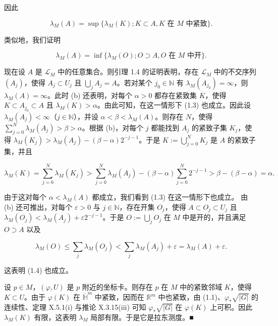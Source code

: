 \begin{proposition}
\begin{items}
因此

\begin{equation}
\lambda_M(A) = \sup\{ \lambda_M(K) ; K \subset A, K \text{ 在 } M \text{ 中紧致} \} .\tag{1.3}
\end{equation}

类似地，我们证明

\begin{equation}
\lambda_M(A) = \inf\{ \lambda_M(O) ; O \supset A, O \text{ 在 } M \text{ 中开} \} .\tag{1.4}
\end{equation}
\item

现在设 $ A $ 是 $ \mathcal{L}_M $ 中的任意集合。则引理 1.4 的证明表明，存在 $ \mathcal{L}_M $ 中的不交序列 $ (A_j) $，使得 $ A_j \subset U_j $ 且 $ \bigcup_j A_j = A $。若对某个 $ j_0 \in \mathbb{N} $ 有 $ \lambda_M(A_{j_0}) = \infty $，则 $ \lambda_M(A) = \infty $。此时 (b) 还表明，对每个 $ \alpha > 0 $ 都存在紧致集 $ K $，使得 $ K \subset A_{j_0} \subset A $ 且 $ \lambda_M(K) > \alpha $。由此可知，在这一情形下 (1.3) 也成立。因此设 $ \lambda_M(A_j) < \infty $（$ j \in \mathbb{N} $），并设 $ \alpha < \beta < \lambda_M(A) $。则存在 $ N $，使得 $ \sum_{j=0}^{N} \lambda_M(A_j) > \beta > \alpha $。根据 (b)，对每个 $ j $ 都能找到 $ A_j $ 的紧致子集 $ K_j $，使得 $ \lambda_M(K_j) > \lambda_M(A_j) - (\beta - \alpha)2^{-j-1} $。于是 $ K := \bigcup_{j=0}^{N} K_j $ 是 $ A $ 的紧致子集，并且

\[
\lambda_M(K) = \sum_{j=0}^{N} \lambda_M(K_j) > \sum_{j=0}^{N} \lambda_M(A_j) - (\beta - \alpha)\sum_{j=0}^{N} 2^{-j-1} > \beta - (\beta - \alpha) = \alpha .
\]

由于这对每个 $ \alpha < \lambda_M(A) $ 都成立，我们看到 (1.3) 在这一情形下也成立。
由 (b) 还可推出，对每个 $ \varepsilon > 0 $ 与 $ j \in \mathbb{N} $，存在开集 $ O_j $，使得 $ A \subset O_j \subset U_j $ 且 $ \lambda_M(O_j) < \lambda_M(A_j) + \varepsilon 2^{-j-1} $。于是 $ O := \bigcup_j O_j $ 在 $ M $ 中是开的，并且满足 $ O \supset A $ 以及

\[
\lambda_M(O) \le \sum_j \lambda_M(O_j) < \sum_j \lambda_M(A_j) + \varepsilon = \lambda_M(A) + \varepsilon .
\]

这表明 (1.4) 也成立。

\item

设 $ p \in M $，$ (\varphi, U) $ 是 $ p $ 附近的坐标卡。则存在 $ p $ 在 $ M $ 中的紧致邻域 $ K $，使得 $ K \subset U $。由于 $ \varphi(K) $ 在 $ \overline{\mathbb{H}}^m $ 中紧致，因而在 $ \mathbb{R}^m $ 中也紧致，由 (1.1)、$ \varphi_*\sqrt{|G|} $ 的连续性、定理 X.5.1(i) 与推论 X.3.15(iii) 可知 $ \varphi_*\sqrt{|G|} $ 在 $ \varphi(K) $ 上可积。因此 $ \lambda_M(K) $ 有限，这表明 $ \lambda_M $ 局部有限。于是它是拉东测度。\nobreak\hspace{0.35em}■

\end{items}

\end{proposition}

